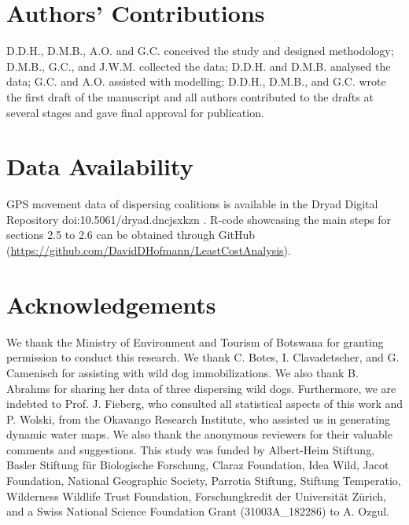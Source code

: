 \documentclass[abstract=on,10pt,a4paper,bibliography=totocnumbered]{article}
\begin{document}
\section{Authors' Contributions}
D.D.H., D.M.B., A.O. and G.C. conceived the study and designed methodology;
D.M.B., G.C., and J.W.M. collected the data; D.D.H. and D.M.B. analysed the
data; G.C. and A.O. assisted with modelling; D.D.H., D.M.B., and G.C. wrote the
first draft of the manuscript and all authors contributed to the drafts at
several stages and gave final approval for publication.

\section{Data Availability}
GPS movement data of dispersing coalitions is available in the Dryad Digital
Repository doi:10.5061/dryad.dncjsxkzn \citep{Hofmann.2021}. R-code showcasing
the main steps for sections 2.5 to 2.6 can be obtained through GitHub
(\url{https://github.com/DavidDHofmann/LeastCostAnalysis}).

\section{Acknowledgements}
We thank the Ministry of Environment and Tourism of Botswana for granting
permission to conduct this research. We thank C. Botes, I. Clavadetscher, and G.
Camenisch for assisting with wild dog immobilizations. We also thank B. Abrahms
for sharing her data of three dispersing wild dogs. Furthermore, we are indebted
to Prof. J. Fieberg, who consulted all statistical aspects of this work and P.
Wolski, from the Okavango Research Institute, who assisted us in generating
dynamic water maps. We also thank the anonymous reviewers for their valuable
comments and suggestions. This study was funded by Albert-Heim Stiftung, Basler
Stiftung für Biologische Forschung, Claraz Foundation, Idea Wild, Jacot
Foundation, National Geographic Society, Parrotia Stiftung, Stiftung Temperatio,
Wilderness Wildlife Trust Foundation, Forschungkredit der Universität Zürich,
and a Swiss National Science Foundation Grant (31003A\_182286) to A. Ozgul.

\newpage
\begingroup
\singlespacing

\endgroup
\end{document}
